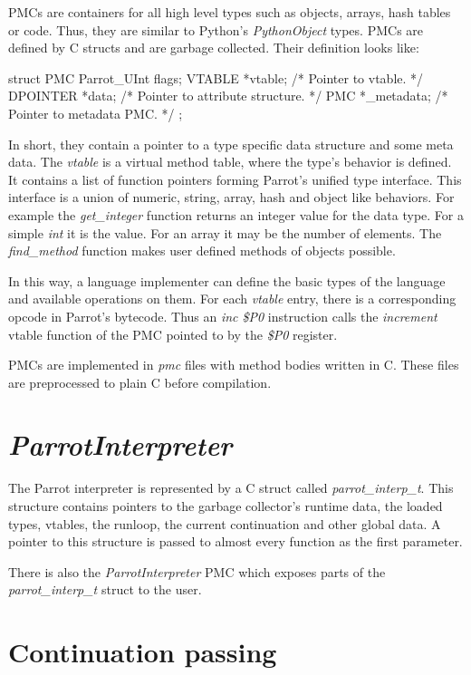 \documentclass[bachelor,english]{hgbthesis}
\begin{document}
PMCs are containers for all high level types such as objects, arrays, hash tables or code. Thus, they are similar to Python's \textit{PythonObject} types. PMCs are defined by C structs and are garbage collected. Their definition looks like:
\begin{CCode}
struct PMC {
    Parrot_UInt    flags;
    VTABLE         *vtable;             /* Pointer to vtable. */
    DPOINTER       *data;               /* Pointer to attribute structure. */
    PMC            *_metadata;          /* Pointer to metadata PMC. */
};
\end{CCode}
In short, they contain a pointer to a type specific data structure and some meta data. The \textit{vtable} is a virtual method table, where the type's behavior is defined. It contains a list of function pointers forming Parrot's unified type interface. This interface is a union of numeric, string, array, hash and object like behaviors. For example the  \textit{get\_integer} function returns an integer value for the data type. For a simple \textit{int} it is the value. For an array it may be the number of elements. The \textit{find\_method} function makes user defined methods of objects possible.

In this way, a language implementer can define the basic types of the language and available operations on them. For each \textit{vtable} entry, there is a corresponding opcode in Parrot's bytecode. Thus an \textit{inc \$P0} instruction calls the \textit{increment} vtable function of the PMC pointed to by the \textit{\$P0} register.

PMCs are implemented in \textit{pmc} files with method bodies written in C. These files are preprocessed to plain C before compilation.

\section{\textit{ParrotInterpreter}}

The Parrot interpreter is represented by a C struct called \textit{parrot\_interp\_t}. This structure contains pointers to the garbage collector's runtime data, the loaded types, vtables, the runloop, the current continuation and other global data. A pointer to this structure is passed to almost every function as the first parameter.

There is also the \textit{ParrotInterpreter} PMC which exposes parts of the \textit{parrot\_interp\_t} struct to the user.

\section{Continuation passing}
\end{document}
